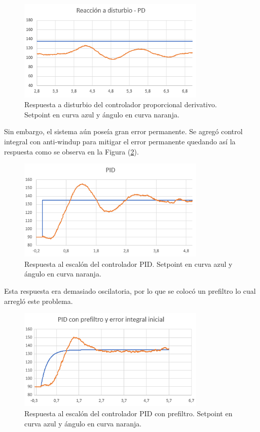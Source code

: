 \begin{figure}[H]
    \centering
    \includegraphics[width=0.8\textwidth]{./Imagenes/kddist.png}
    \caption{Respuesta a disturbio del controlador proporcional derivativo. Setpoint en curva azul y ángulo en curva naranja.}
    \label{fig:kddist}
\end{figure}

Sin embargo, el sistema aún poseía gran error permanente. Se agregó control integral con anti-windup para mitigar el error permanente quedando así la respuesta como se observa en la Figura (\ref{fig:ki}).

\begin{figure}[H]
    \centering
    \includegraphics[width=0.8\textwidth]{./Imagenes/ki.png}
    \caption{Respuesta al escalón del controlador PID. Setpoint en curva azul y ángulo en curva naranja.}
    \label{fig:ki}
\end{figure}

Esta respuesta era demasiado oscilatoria, por lo que se colocó un prefiltro lo cual arregló este problema.

\begin{figure}[H]
    \centering
    \includegraphics[width=0.8\textwidth]{./Imagenes/pidcompleto.png}
    \caption{Respuesta al escalón del controlador PID con prefiltro. Setpoint en curva azul y ángulo en curva naranja.}
    \label{fig:pidcompleto}
\end{figure}

